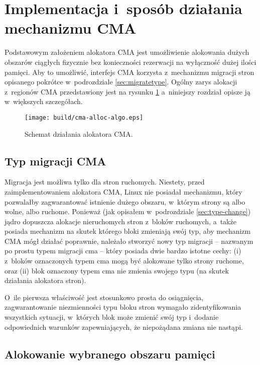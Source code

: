 \section{Implementacja i~sposób działania mechanizmu CMA}

Podstawowym założeniem alokatora CMA jest umożliwienie alokowania
dużych obszarów ciągłych fizycznie bez konieczności rezerwacji na
wyłączność dużej ilości pamięci.  Aby to umożliwić, interfejs CMA
korzysta z~mechanizmu migracji stron opisanego pokrótce w~podrozdziale
\ref{sec:migratetype}.  Ogólny zarys alokacji z~regionów CMA
przedstawiony jest na rysunku \ref{fig:cma-alloc-algo} a~niniejszy
rozdział opisze ją w~większych szczegółach.

\begin{figure}[tbp]
  \texttt{[image: build/cma-alloc-algo.eps]}
  \caption{Schemat działania alokatora CMA.}
  \label{fig:cma-alloc-algo}
\end{figure}


\subsection{Typ migracji CMA}\label{sec:migrate-cma}

Migracja jest możliwa tylko dla stron ruchomych.  Niestety, przed
zaimplementowaniem alokatora CMA, Linux nie posiadał mechanizmu, który
pozwalałby zagwarantować istnienie dużego obszaru, w~którym strony są
albo wolne, albo ruchome.  Ponieważ (jak opisałem w~podrozdziale
\ref{sec:type-change}) jądro dopuszcza alokacje nieruchomych stron
z~bloków ruchomych, a~także posiada mechanizm na skutek którego bloki
zmieniają swój typ, aby mechanizm CMA mógł działać poprawnie, należało
stworzyć nowy typ migracji -- nazwanym po prostu typem migracji cma --
który posiada dwie bardzo istotne cechy: (i) z~bloków oznaczonych
typem cma mogą być alokowane tylko strony ruchome, oraz (ii) blok
oznaczony typem cma nie zmienia swojego typu (na skutek działania
alokatora stron).

O~ile pierwsza właściwość jest stosunkowo prosta do osiągnięcia,
zagwarantowanie niezmienności typu bloku stron wymagało
zidentyfikowania wszystkich sytuacji, w~których blok może zmienić swój
typ i~dodanie odpowiednich warunków zapewniających, że niepożądana
zmiana nie nastąpi.

\subsection{Alokowanie wybranego obszaru pamięci}\label{sec:alloc-contig-range}

